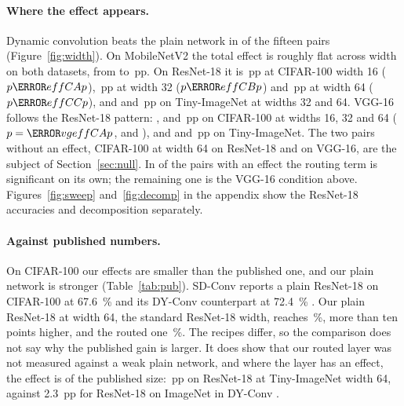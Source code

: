 \documentclass[10pt,a4paper]{article}
\begin{document}
\paragraph{Where the effect appears.} Dynamic convolution beats the plain
network in  of the fifteen pairs (Figure~\ref{fig:width}). On
MobileNetV2 the total effect is roughly flat across width on both
datasets, from  to \,pp. On ResNet-18 it is
\,pp at CIFAR-100 width 16 ($p\V{effCAp}$), \,pp at width
32 ($p\V{effCBp}$) and \,pp at width 64 ($p\V{effCCp}$), and
 and \,pp on Tiny-ImageNet at widths 32 and 64. VGG-16
follows the ResNet-18 pattern: ,  and
\,pp on CIFAR-100 at widths 16, 32 and 64
($p=\V{vgeffCAp}$,  and ), and  and
\,pp on Tiny-ImageNet. The two pairs without an effect, CIFAR-100
at width 64 on ResNet-18 and on VGG-16, are the subject of
Section~\ref{sec:null}. In  of the  pairs with an
effect the routing term is significant on its own; the remaining one is
the VGG-16 condition above. Figures~\ref{fig:sweep} and~\ref{fig:decomp}
in the appendix show the ResNet-18 accuracies and decomposition
separately.

\paragraph{Against published numbers.} On CIFAR-100 our effects are
smaller than the published one, and our plain network is stronger
(Table~\ref{tab:pub}). SD-Conv reports a plain ResNet-18 on CIFAR-100 at
\SI{67.6}{\percent} and its DY-Conv counterpart at \SI{72.4}{\percent}
\citep[Table 1]{he2023sdconv}. Our plain ResNet-18 at width 64, the
standard ResNet-18 width, reaches \,\%, more than ten points
higher, and the routed one \,\%. The recipes differ, so the
comparison does not say why the published gain is larger. It does show
that our routed layer was not measured against a weak plain network, and
where the layer has an effect, the effect is of the published size:
\,pp on ResNet-18 at Tiny-ImageNet width 64, against
\SI{2.3}{pp} for ResNet-18 on ImageNet in DY-Conv
\citep[Table 8]{chen2020dynamic}.
\end{document}
